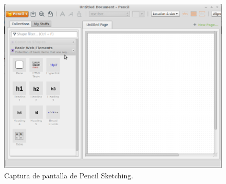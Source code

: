 \begin{figure}[htbp]
\centering\includegraphics[width=13cm]{img/pencil.png}
\caption{Captura de pantalla de Pencil Sketching.}
\label{fig:pencil}
\end{figure} 


